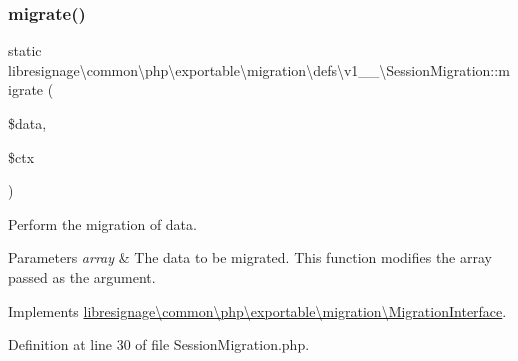 \subsubsection{\texorpdfstring{migrate()}{migrate()}}
{\footnotesize\ttfamily static libresignage\textbackslash{}common\textbackslash{}php\textbackslash{}exportable\textbackslash{}migration\textbackslash{}defs\textbackslash{}v1\+\_\+\_\textbackslash{}\+Session\+Migration\+::migrate (\begin{DoxyParamCaption}\item[{array \&}]{\$data,  }\item[{\hyperlink{classlibresignage_1_1common_1_1php_1_1exportable_1_1ExportableDataContext}{Exportable\+Data\+Context}}]{\$ctx }\end{DoxyParamCaption})\hspace{0.3cm}{\ttfamily [static]}}

Perform the migration of data.


\begin{DoxyParams}{Parameters}
{\em array} & The data to be migrated. This function modifies the array passed as the argument. \\
\hline
\end{DoxyParams}


Implements \hyperlink{interfacelibresignage_1_1common_1_1php_1_1exportable_1_1migration_1_1MigrationInterface_a8275bfe14f59f19bb3b33b239fd48c5d}{libresignage\textbackslash{}common\textbackslash{}php\textbackslash{}exportable\textbackslash{}migration\textbackslash{}\+Migration\+Interface}.



Definition at line 30 of file Session\+Migration.\+php.

\mbox{\label{classlibresignage_1_1common_1_1php_1_1exportable_1_1migration_1_1defs_1_1v1__1__0_1_1SessionMigration_a18278527a7e72394990621ee1b345cee}} 
